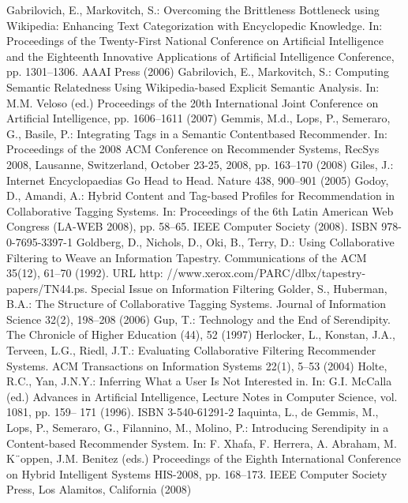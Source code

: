 \begin{thebibliography}{110}
Gabrilovich, E., Markovitch, S.: Overcoming the Brittleness Bottleneck using Wikipedia: Enhancing Text Categorization with Encyclopedic Knowledge. In: Proceedings of the Twenty-First National Conference on Artificial Intelligence and the Eighteenth Innovative Applications of Artificial Intelligence Conference, pp. 1301–1306. AAAI Press (2006)
Gabrilovich, E., Markovitch, S.: Computing Semantic Relatedness Using Wikipedia-based Explicit Semantic Analysis. In: M.M. Veloso (ed.) Proceedings of the 20th International Joint Conference on Artificial Intelligence, pp. 1606–1611 (2007)
Gemmis, M.d., Lops, P., Semeraro, G., Basile, P.: Integrating Tags in a Semantic Contentbased Recommender. In: Proceedings of the 2008 ACM Conference on Recommender Systems, RecSys 2008, Lausanne, Switzerland, October 23-25, 2008, pp. 163–170 (2008)
Giles, J.: Internet Encyclopaedias Go Head to Head. Nature 438, 900–901 (2005)
Godoy, D., Amandi, A.: Hybrid Content and Tag-based Profiles for Recommendation in Collaborative Tagging Systems. In: Proceedings of the 6th Latin American Web Congress (LA-WEB 2008), pp. 58–65. IEEE Computer Society (2008). ISBN 978-0-7695-3397-1
Goldberg, D., Nichols, D., Oki, B., Terry, D.: Using Collaborative Filtering to Weave an Information Tapestry. Communications of the ACM 35(12), 61–70 (1992). URL http: //www.xerox.com/PARC/dlbx/tapestry-papers/TN44.ps. Special Issue on Information Filtering
Golder, S., Huberman, B.A.: The Structure of Collaborative Tagging Systems. Journal of Information Science 32(2), 198–208 (2006)
Gup, T.: Technology and the End of Serendipity. The Chronicle of Higher Education (44), 52 (1997)
Herlocker, L., Konstan, J.A., Terveen, L.G., Riedl, J.T.: Evaluating Collaborative Filtering Recommender Systems. ACM Transactions on Information Systems 22(1), 5–53 (2004)
Holte, R.C., Yan, J.N.Y.: Inferring What a User Is Not Interested in. In: G.I. McCalla (ed.) Advances in Artificial Intelligence, Lecture Notes in Computer Science, vol. 1081, pp. 159– 171 (1996). ISBN 3-540-61291-2
Iaquinta, L., de Gemmis, M., Lops, P., Semeraro, G., Filannino, M., Molino, P.: Introducing Serendipity in a Content-based Recommender System. In: F. Xhafa, F. Herrera, A. Abraham, M. K¨oppen, J.M. Benitez (eds.) Proceedings of the Eighth International Conference on Hybrid Intelligent Systems HIS-2008, pp. 168–173. IEEE Computer Society Press, Los Alamitos, California (2008)

\end{thebibliography}
